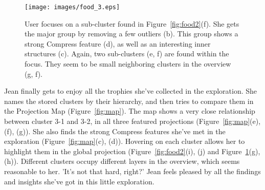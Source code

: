 \begin{figure}[htbp]
\centering
  \texttt{[image: images/food\_3.eps]}%
  \caption{User focuses on a sub-cluster found in Figure~\ref{fig:food2}(f). She gets the major group by removing a few outliers (b). This group shows a strong Compress feature (d), as well as an interesting inner structures (c). Again, two sub-clusters (e, f) are found within the focus. They seem to be small neighboring clusters in the overview (g, f).}
\label{fig:food3}
  \end{figure}

Jean finally gets to enjoy all the trophies she've collected in the exploration. She names the stored clusters by their hierarchy, and then tries to compare them in the Projection Map (Figure~\ref{fig:map}). The map shows a very close relationship between cluster 3-1 and 3-2, in all three featured projections (Figure~\ref{fig:map}(e), (f), (g)). She also finds the strong Compress features she've met in the exploration (Figure~\ref{fig:map}(c), (d)). Hovering on each cluster allows her to highlight them in the global projection (Figure~\ref{fig:food2}(i), (j) and Figure~\ref{fig:food3}(g), (h)). Different clusters occupy different layers in the overview, which seems reasonable to her. 'It's not that hard, right?' Jean feels pleased by all the findings and insights she've got in this little exploration.

